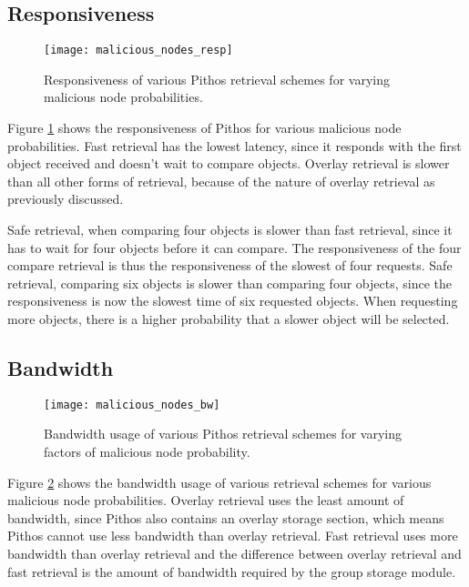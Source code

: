 \subsection{Responsiveness}
\begin{figure}[htbp]
 \centering
 \texttt{[image: malicious\_nodes\_resp]}
 \caption{Responsiveness of various Pithos retrieval schemes for varying malicious node probabilities.}
 \label{fig_malicious_nodes_resp}
\end{figure}
%
Figure \ref{fig_malicious_nodes_resp} shows the responsiveness of Pithos for various malicious node probabilities. Fast retrieval has the lowest latency, since it responds with the first object received and doesn't wait to compare objects. Overlay retrieval is slower than all other forms of retrieval, because of the nature of overlay retrieval as previously discussed.

Safe retrieval, when comparing four objects is slower than fast retrieval, since it has to wait for four objects before it can compare. The responsiveness of the four compare retrieval is thus the responsiveness of the slowest of four requests. Safe retrieval, comparing six objects is slower than comparing four objects, since the responsiveness is now the slowest time of six requested objects. When requesting more objects, there is a higher probability that a slower object will be selected.

\subsection{Bandwidth}
\begin{figure}[htbp]
 \centering
 \texttt{[image: malicious\_nodes\_bw]}
 \caption{Bandwidth usage of various Pithos retrieval schemes for varying factors of malicious node probability.}
 \label{fig_malicious_nodes_bw}
\end{figure}
%
Figure \ref{fig_malicious_nodes_bw} shows the bandwidth usage of various retrieval schemes for various malicious node probabilities. Overlay retrieval uses the least amount of bandwidth, since Pithos also contains an overlay storage section, which means Pithos cannot use less bandwidth than overlay retrieval. Fast retrieval uses more bandwidth than overlay retrieval and the difference between overlay retrieval and fast retrieval is the amount of bandwidth required by the group storage module.

